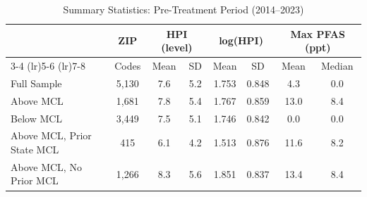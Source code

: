 \begin{table}[htbp]
\centering
\caption{Summary Statistics: Pre-Treatment Period (2014--2023)}
\label{tab:summary}
\begin{tabular}{lccccccc}
\hline\hline
 & ZIP & \multicolumn{2}{c}{HPI (level)} & \multicolumn{2}{c}{log(HPI)} & \multicolumn{2}{c}{Max PFAS (ppt)} \\
\cmidrule(lr){3-4} \cmidrule(lr){5-6} \cmidrule(lr){7-8}
 & Codes & Mean & SD & Mean & SD & Mean & Median \\
\hline
Full Sample & 5,130 & 7.6 & 5.2 & 1.753 & 0.848 & 4.3 & 0.0 \\
\hline
Above MCL & 1,681 & 7.8 & 5.4 & 1.767 & 0.859 & 13.0 & 8.4 \\
Below MCL & 3,449 & 7.5 & 5.1 & 1.746 & 0.842 & 0.0 & 0.0 \\
\hline
Above MCL, Prior State MCL & 415 & 6.1 & 4.2 & 1.513 & 0.876 & 11.6 & 8.2 \\
Above MCL, No Prior MCL & 1,266 & 8.3 & 5.6 & 1.851 & 0.837 & 13.4 & 8.4 \\
\hline\hline
\end{tabular}
\par{}
\end{table}

